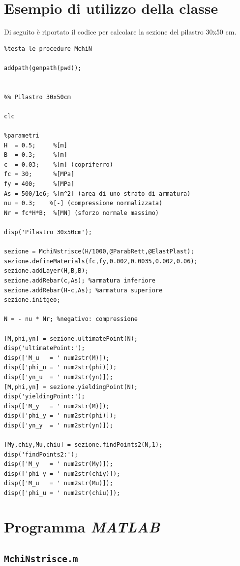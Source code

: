 \documentclass[10pt]{article}
\begin{document}
\section{Esempio di utilizzo della classe}

Di seguito è riportato il codice per calcolare la sezione del pilastro 30x50 cm.

\begin{lstlisting}
%testa le procedure MchiN

addpath(genpath(pwd));


%% Pilastro 30x50cm

clc

%parametri
H  = 0.5;     %[m]
B  = 0.3;     %[m]
c  = 0.03;    %[m] (copriferro)
fc = 30;      %[MPa]
fy = 400;     %[MPa]
As = 500/1e6; %[m^2] (area di uno strato di armatura)
nu = 0.3;    %[-] (compressione normalizzata)
Nr = fc*H*B;  %[MN] (sforzo normale massimo)

disp('Pilastro 30x50cm');

sezione = MchiNstrisce(H/1000,@ParabRett,@ElastPlast);
sezione.defineMaterials(fc,fy,0.002,0.0035,0.002,0.06);
sezione.addLayer(H,B,B);
sezione.addRebar(c,As); %armatura inferiore
sezione.addRebar(H-c,As); %armatura superiore
sezione.initgeo;

N = - nu * Nr; %negativo: compressione

[M,phi,yn] = sezione.ultimatePoint(N);
disp('ultimatePoint:');
disp(['M_u   = ' num2str(M)]);
disp(['phi_u = ' num2str(phi)]);
disp(['yn_u  = ' num2str(yn)]);
[M,phi,yn] = sezione.yieldingPoint(N);
disp('yieldingPoint:');
disp(['M_y   = ' num2str(M)]);
disp(['phi_y = ' num2str(phi)]);
disp(['yn_y  = ' num2str(yn)]);

[My,chiy,Mu,chiu] = sezione.findPoints2(N,1);
disp('findPoints2:');
disp(['M_y   = ' num2str(My)]);
disp(['phi_y = ' num2str(chiy)]);
disp(['M_u   = ' num2str(Mu)]);
disp(['phi_u = ' num2str(chiu)]);
\end{lstlisting}



\newpage

\section{Programma \textit{MATLAB}}

\subsection{\texttt{MchiNstrisce.m}}
\end{document}
